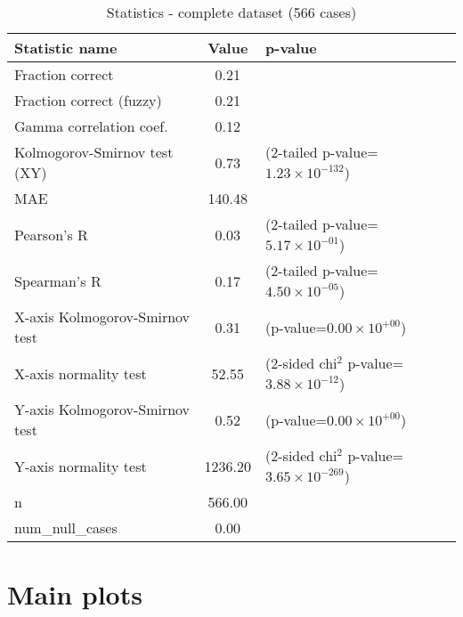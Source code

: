 \documentclass[10pt, letterpaper, oneside, titlepage, landscape]{scrreprt}
\begin{document}
\begin{table}[H]\begin{center}
\begin{tabular}{ l S[table-format=3.2] l}
Statistic name & {Value} & p-value\\
\hline
Fraction correct & 0.21 & \\
Fraction correct (fuzzy) & 0.21 & \\
Gamma correlation coef. & 0.12 & \\
Kolmogorov-Smirnov test (XY) & 0.73 & (2-tailed p-value=$1.23\times10^{-132}$)\\
MAE & 140.48 & \\
Pearson's R & 0.03 & (2-tailed p-value=$5.17\times10^{-01}$)\\
Spearman's R & 0.17 & (2-tailed p-value=$4.50\times10^{-05}$)\\
X-axis Kolmogorov-Smirnov test & 0.31 & (p-value=$0.00\times10^{+00}$)\\
X-axis normality test & 52.55 & (2-sided chi$^{2}$ p-value=$3.88\times10^{-12}$)\\
Y-axis Kolmogorov-Smirnov test & 0.52 & (p-value=$0.00\times10^{+00}$)\\
Y-axis normality test & 1236.20 & (2-sided chi$^{2}$ p-value=$3.65\times10^{-269}$)\\
n & 566.00 & \\
num\_null\_cases & 0.00 & \\
\end{tabular}
\caption{Statistics - complete dataset (566 cases)}
\end{center}\end{table}



\clearpage

\section{Main plots}
\end{document}
